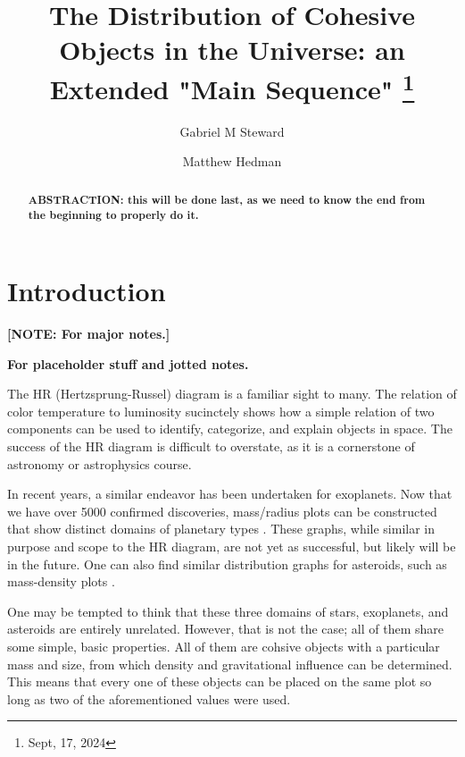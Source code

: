 \documentclass[twocolumn,linenumbers]{aastex631}
\begin{document}
\title{The Distribution of Cohesive Objects in the Universe: an Extended "Main Sequence"
\footnote{Sept, 17, 2024}}

\author[0000-0002-8482-4669]{Gabriel M Steward}

\author{Matthew Hedman}

\begin{abstract}

\textbf{\color{red}ABSTRACTION: this will be done last, as we need to know the end from the beginning to properly do it.\color{black}}

\end{abstract}


\section{Introduction} \label{sec:intro}

\textbf{\color{red} [NOTE: For major notes.] \color{black}}

\textbf{\color{blue}For placeholder stuff and jotted notes. \color{black}}

The HR (Hertzsprung-Russel) diagram is a familiar sight to many. The relation of color temperature to luminosity sucinctely shows how a simple relation of two components can be used to identify, categorize, and explain objects in space. The success of the HR diagram is difficult to overstate, as it is a cornerstone of astronomy or astrophysics course. 

In recent years, a similar endeavor has been undertaken for exoplanets. Now that we have over 5000 confirmed discoveries, mass/radius plots can be constructed that show distinct domains of planetary types \citep{Chen2016, Muller2024}. These graphs, while similar in purpose and scope to the HR diagram, are not yet as successful, but likely will be in the future. One can also find similar distribution graphs for asteroids, such as mass-density plots \citep{Carry2012}. 

One may be tempted to think that these three domains of stars, exoplanets, and asteroids are entirely unrelated. However, that is not the case; all of them share some simple, basic properties. All of them are cohsive objects with a particular mass and size, from which density and gravitational influence can be determined. This means that every one of these objects can be placed on the same plot so long as two of the aforementioned values were used. 
\end{document}
